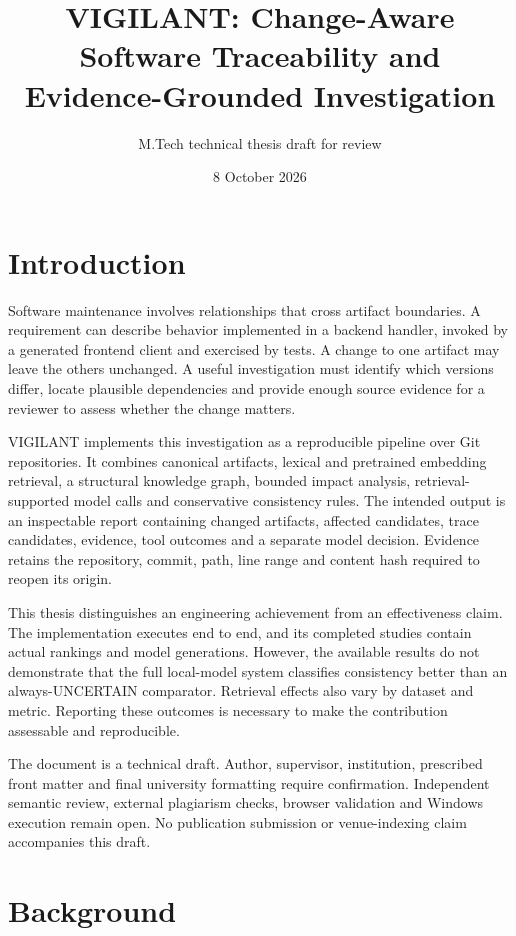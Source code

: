 \documentclass[
  11pt,
  a4paper,
]{report}
\title{VIGILANT: Change-Aware Software Traceability and
Evidence-Grounded Investigation}
\subtitle{M.Tech technical thesis draft for review}
\author{}
\date{8 October 2026}
\begin{document}
\maketitle

{
\hypersetup{linkcolor=}
\setcounter{tocdepth}{0}
\tableofcontents
}
\hypertarget{introduction}{%
\chapter{Introduction}\label{introduction}}

Software maintenance involves relationships that cross artifact
boundaries. A requirement can describe behavior implemented in a backend
handler, invoked by a generated frontend client and exercised by tests.
A change to one artifact may leave the others unchanged. A useful
investigation must identify which versions differ, locate plausible
dependencies and provide enough source evidence for a reviewer to assess
whether the change matters.

VIGILANT implements this investigation as a reproducible pipeline over
Git repositories. It combines canonical artifacts, lexical and
pretrained embedding retrieval, a structural knowledge graph, bounded
impact analysis, retrieval-supported model calls and conservative
consistency rules. The intended output is an inspectable report
containing changed artifacts, affected candidates, trace candidates,
evidence, tool outcomes and a separate model decision. Evidence retains
the repository, commit, path, line range and content hash required to
reopen its origin.

This thesis distinguishes an engineering achievement from an
effectiveness claim. The implementation executes end to end, and its
completed studies contain actual rankings and model generations.
However, the available results do not demonstrate that the full
local-model system classifies consistency better than an
always-UNCERTAIN comparator. Retrieval effects also vary by dataset and
metric. Reporting these outcomes is necessary to make the contribution
assessable and reproducible.

The document is a technical draft. Author, supervisor, institution,
prescribed front matter and final university formatting require
confirmation. Independent semantic review, external plagiarism checks,
browser validation and Windows execution remain open. No publication
submission or venue-indexing claim accompanies this draft.

\hypertarget{background}{%
\chapter{Background}\label{background}}
\end{document}
